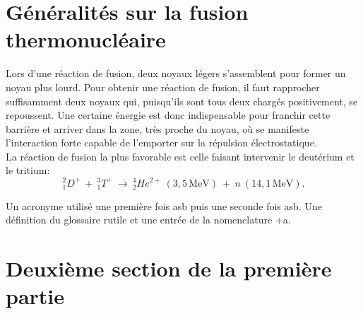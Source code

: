 \section{Généralités sur la fusion thermonucléaire}

	Lors d'une réaction de fusion, deux noyaux légers s'assemblent pour former un noyau plus lourd. Pour obtenir une réaction de fusion, il faut rapprocher suffisamment deux noyaux qui, puisqu'ils sont tous deux chargés positivement, se repoussent. Une certaine énergie est donc indispensable pour franchir cette barrière et arriver dans la zone, très proche du noyau, où se manifeste l'interaction forte capable de l'emporter sur la répulsion électrostatique.
	\\ %
	La réaction de fusion la plus favorable est celle faisant intervenir le deutérium et le tritium:
	$$_{1}^{2}D^{+}~+~_{1}^{3}T^{+}~\rightarrow ~_{2}^{4}He^{2+}~(3,5\,\textrm{MeV})~+~n~(14,1\,\textrm{MeV}).$$

	\noindent %
	\lipsum[2]
	Un acronyme utilisé une première fois \gls{asb} puis une seconde fois \gls{asb}. Une définition du glossaire \gls{rutile} et une entrée de la nomenclature \gls{+a}.

\section{Deuxième section de la première partie}

	\lipsum[2]
